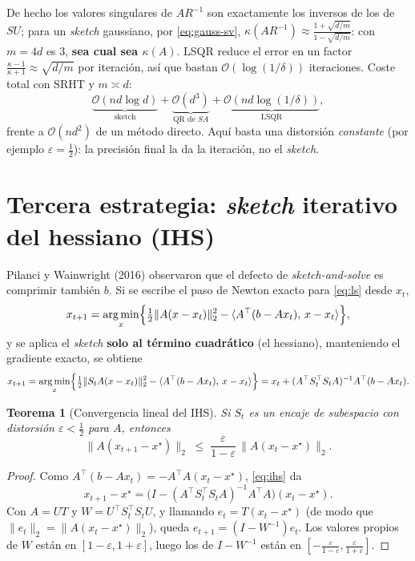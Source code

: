 \documentclass[11pt,a4paper,oneside]{book}
\newtheorem{teorema}{Teorema}[chapter]
\theoremstyle{definition}
\theoremstyle{remark}
\newcommand{\cO}{\mathcal{O}}
\newcommand{\T}{^{\top}}
\newcommand{\eps}{\varepsilon}
\newcommand{\nrm}[1]{\lVert #1\rVert}
\newcommand{\ip}[2]{\langle #1,\, #2\rangle}
\DeclareMathOperator*{\argmin}{arg\,min}
\begin{document}
De hecho los valores singulares de $AR^{-1}$ son exactamente los inversos de los de $SU$; para un \emph{sketch}
gaussiano, por \eqref{eq:gauss-sv}, $\kappa(AR^{-1})\approx\frac{1+\sqrt{d/m}}{1-\sqrt{d/m}}$: con $m=4d$ es $3$, \textbf{sea
cual sea $\kappa(A)$}. LSQR reduce el error en un factor $\frac{\kappa-1}{\kappa+1}\approx\sqrt{d/m}$ por iteración,
así que bastan $\cO(\log(1/\delta))$ iteraciones. Coste total con SRHT y $m\asymp d$:
\[ \underbrace{\cO(nd\log d)}_{\text{sketch}}+\underbrace{\cO(d^3)}_{\text{QR de }SA}+\underbrace{\cO(nd\log(1/\delta))}_{\text{LSQR}}, \]
frente a $\cO(nd^2)$ de un método directo. Aquí basta una distorsión \emph{constante} (por ejemplo
$\eps=\tfrac12$): la precisión final la da la iteración, no el \emph{sketch}.

\section{Tercera estrategia: \emph{sketch} iterativo del hessiano (IHS)}\label{sec:ihs}

Pilanci y Wainwright (2016) observaron que el defecto de \emph{sketch-and-solve} es comprimir también $b$. Si
se escribe el paso de Newton exacto para \eqref{eq:ls} desde $x_t$,
\[ x_{t+1}=\argmin_x\Bigl\{\tfrac12\nrm{A(x-x_t)}_2^2-\ip{A\T(b-Ax_t)}{x-x_t}\Bigr\}, \]
y se aplica el \emph{sketch} \textbf{solo al término cuadrático} (el hessiano), manteniendo el gradiente exacto, se obtiene
\begin{equation}\label{eq:ihs}
  x_{t+1}=\argmin_x\Bigl\{\tfrac12\nrm{S_tA(x-x_t)}_2^2-\ip{A\T(b-Ax_t)}{x-x_t}\Bigr\}
  =x_t+(A\T S_t\T S_tA)^{-1}A\T(b-Ax_t).
\end{equation}

\begin{teorema}[Convergencia lineal del IHS]\label{teo:ihs}
Si $S_t$ es un encaje de subespacio con distorsión $\eps<\tfrac12$ para $A$, entonces
\[ \nrm{A(x_{t+1}-x^\star)}_2\;\le\;\frac{\eps}{1-\eps}\,\nrm{A(x_t-x^\star)}_2 . \]
\end{teorema}

\begin{proof}
Como $A\T(b-Ax_t)=-A\T A(x_t-x^\star)$, \eqref{eq:ihs} da
\[ x_{t+1}-x^\star=\bigl(I-(A\T S_t\T S_tA)^{-1}A\T A\bigr)(x_t-x^\star). \]
Con $A=UT$ y $W=U\T S_t\T S_tU$, y llamando $e_t=T(x_t-x^\star)$ (de modo que $\nrm{e_t}_2=\nrm{A(x_t-x^\star)}_2$), queda
$e_{t+1}=(I-W^{-1})e_t$. Los valores propios de $W$ están en $[1-\eps,1+\eps]$, luego los de $I-W^{-1}$ están en
$[-\frac{\eps}{1-\eps},\frac{\eps}{1+\eps}]$.
\end{proof}
\end{document}
